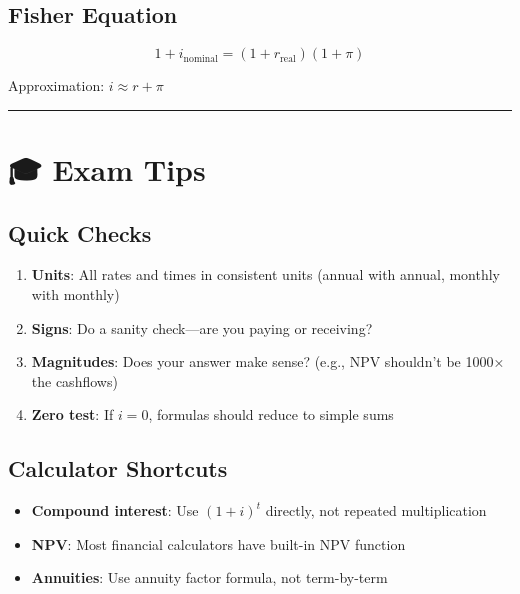 \documentclass[
  letterpaper,
]{scrbook}
\providecommand{\tightlist}{%
  \setlength{\itemsep}{0pt}\setlength{\parskip}{0pt}}
\begin{document}
\subsection*{Fisher Equation}\label{fisher-equation}

\[
1 + i_{\text{nominal}} = (1 + r_{\text{real}})(1 + \pi)
\]

Approximation: \(i \approx r + \pi\)

\begin{center}\rule{0.5\linewidth}{0.5pt}\end{center}

\section*{🎓 Exam Tips}\label{exam-tips}


\subsection*{Quick Checks}\label{quick-checks}

\begin{enumerate}
\def\labelenumi{\arabic{enumi}.}
\tightlist
\item
  \textbf{Units}: All rates and times in consistent units (annual with
  annual, monthly with monthly)
\item
  \textbf{Signs}: Do a sanity check---are you paying or receiving?
\item
  \textbf{Magnitudes}: Does your answer make sense? (e.g., NPV shouldn't
  be 1000× the cashflows)
\item
  \textbf{Zero test}: If \(i=0\), formulas should reduce to simple sums
\end{enumerate}

\subsection*{Calculator Shortcuts}\label{calculator-shortcuts}

\begin{itemize}
\tightlist
\item
  \textbf{Compound interest}: Use \((1+i)^t\) directly, not repeated
  multiplication
\item
  \textbf{NPV}: Most financial calculators have built-in NPV function
\item
  \textbf{Annuities}: Use annuity factor formula, not term-by-term
\end{itemize}
\end{document}
